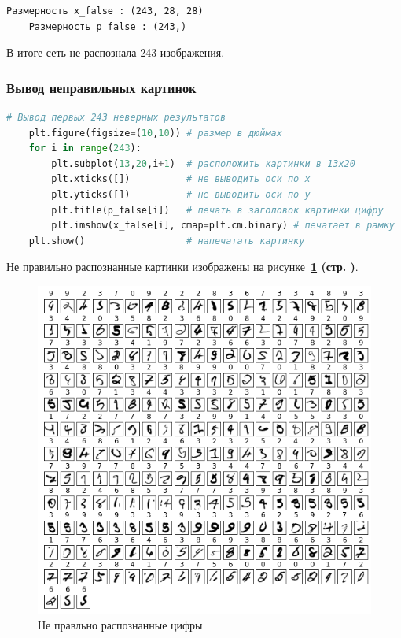 \begin{lstlisting}[name=Вывод в консоль,]
    Размерность x_false : (243, 28, 28)
    Размерность p_false : (243,)
\end{lstlisting}

В итоге сеть не распознала 243 изображения.



\newpage



\subsubsection{Вывод неправильных картинок}

\begin{lstlisting}[language=Python,]
    # Вывод первых 243 неверных результатов
    plt.figure(figsize=(10,10)) # размер в дюймах
    for i in range(243):
        plt.subplot(13,20,i+1)  # расположить картинки в 13x20
        plt.xticks([])          # не выводить оси по x
        plt.yticks([])          # не выводить оси по y
        plt.title(p_false[i])   # печать в заголовок картинки цифру
        plt.imshow(x_false[i], cmap=plt.cm.binary) # печатает в рамку
    plt.show()                  # напечатать картинку
\end{lstlisting}

Не правильно распознанные картинки изображены на
рисунке~\textbf{\ref{fig:4_not_right_imgs} (стр. \pageref{fig:4_not_right_imgs})}.

\begin{figure}[!htbp]
    \centering
    \includegraphics[width=14cm]
    {../_INCLUDES/main/4/not_right_imgs.png}
    \caption{Не правльно распознанные цифры}
    \label{fig:4_not_right_imgs}
\end{figure}